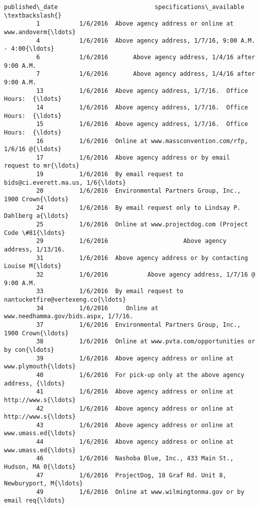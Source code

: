 \documentclass[11pt]{article}
\begin{document}
\begin{Verbatim}[commandchars=\\\{\}]
               published\_date                           specifications\_available  \textbackslash{}
         1           1/6/2016  Above agency address or online at www.andoverm{\ldots}   
         4           1/6/2016  Above agency address, 1/7/16, 9:00 A.M. - 4:00{\ldots}   
         6           1/6/2016       Above agency address, 1/4/16 after 9:00 A.M.   
         7           1/6/2016       Above agency address, 1/4/16 after 9:00 A.M.   
         13          1/6/2016  Above agency address, 1/7/16.  Office Hours:  {\ldots}   
         14          1/6/2016  Above agency address, 1/7/16.  Office Hours:  {\ldots}   
         15          1/6/2016  Above agency address, 1/7/16.  Office Hours:  {\ldots}   
         16          1/6/2016  Online at www.massconvention.com/rfp, 1/6/16 @{\ldots}   
         17          1/6/2016  Above agency address or by email request to mr{\ldots}   
         19          1/6/2016  By email request to bids@ci.everett.ma.us, 1/6{\ldots}   
         20          1/6/2016  Environmental Partners Group, Inc., 1900 Crown{\ldots}   
         24          1/6/2016  By email request only to Lindsay P. Dahlberg a{\ldots}   
         25          1/6/2016  Online at www.projectdog.com (Project Code \#81{\ldots}   
         29          1/6/2016                     Above agency address, 1/13/16.   
         31          1/6/2016  Above agency address or by contacting Louise M{\ldots}   
         32          1/6/2016           Above agency address, 1/7/16 @ 9:00 A.M.   
         33          1/6/2016  By email request to nantucketfire@vertexeng.co{\ldots}   
         34          1/6/2016     Online at www.needhamma.gov/bids.aspx, 1/7/16.   
         37          1/6/2016  Environmental Partners Group, Inc., 1900 Crown{\ldots}   
         38          1/6/2016  Online at www.pvta.com/opportunities or by con{\ldots}   
         39          1/6/2016  Above agency address or online at www.plymouth{\ldots}   
         40          1/6/2016  For pick-up only at the above agency address, {\ldots}   
         41          1/6/2016  Above agency address or online at http://www.s{\ldots}   
         42          1/6/2016  Above agency address or online at http://www.s{\ldots}   
         43          1/6/2016  Above agency address or online at www.umass.ed{\ldots}   
         44          1/6/2016  Above agency address or online at www.umass.ed{\ldots}   
         46          1/6/2016  Nashoba Blue, Inc., 433 Main St., Hudson, MA 0{\ldots}   
         47          1/6/2016  ProjectDog, 18 Graf Rd. Unit 8, Newburyport, M{\ldots}   
         49          1/6/2016  Online at www.wilmingtonma.gov or by email req{\ldots}   

\end{Verbatim}
\end{document}
